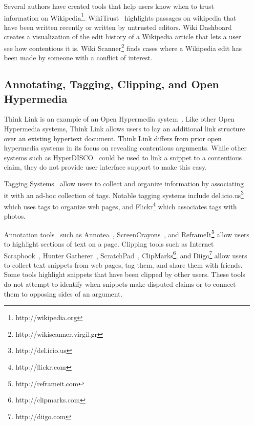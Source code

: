\documentclass{chi2009}
\newcommand{\todo}[1]{}
\begin{document}
Several authors have created tools that help users know when to trust information on Wikipedia\footnote{http://wikipedia.org}. WikiTrust~\cite{Adler2008a} highlights passages on wikipedia that have been written recently or written by untrusted editors. Wiki Dashboard~\cite{Kittur2008} creates a visualization of the edit history of a Wikipedia article that lets a user see how contentious it is. Wiki Scanner\footnote{http://wikiscanner.virgil.gr} finds cases where a Wikipedia edit has been made by someone with a conflict of interest.

% 
% 

\subsection{Annotating, Tagging, Clipping, and Open Hypermedia}

Think Link is an example of an Open Hypermedia system~\cite{Bouvin2000}. Like other Open Hypermedia systems, Think Link allows users to lay an additional link structure over an existing hypertext document. Think Link differs from prior open hypermedia systems in its focus on revealing contentious arguments. While other systems such as HyperDISCO~\cite{Wiil1996} could be used to link a snippet to a contentious claim, they do not provide user interface support to make this easy.

\todo{Say how different from other Open Hypermedia link annotation systems}

Tagging Systems~\cite{Marlow2006,Golder2006} allow users to collect and organize information by associating it with an ad-hoc collection of tags. Notable tagging systems include del.icio.us\footnote{http://del.icio.us} which uses tags to organize web pages, and Flickr\footnote{http://flickr.com} which associates tags with photos. 

Annotation tools~\cite{Marshall1998} such as Annotea~\cite{Koivunen2001}, ScreenCrayons~\cite{Olsen2004}, and ReframeIt\footnote{http://reframeit.com} allow users to highlight sections of text on a page. Clipping tools such as Internet Scrapbook~\cite{Sugiura1998}, Hunter Gatherer~\cite{Schraefel2002}, ScratchPad~\cite{Gotz2007}, ClipMarks\footnote{http://clipmarks.com}, and Diigo\footnote{http://diigo.com} allow users to collect text snippets from web pages, tag them, and share them with friends. Some tools highlight snippets that have been clipped by other users. These tools do not attempt to identify when snippets make disputed claims or to connect them to opposing sides of an argument.
\end{document}

